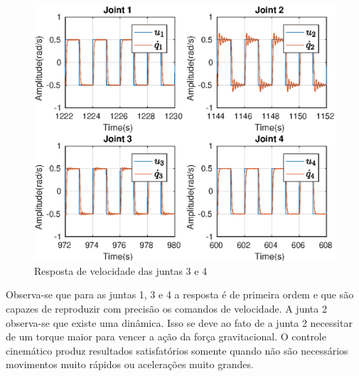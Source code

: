 \begin{figure}[H]
  \centering
    \includegraphics[width=\textwidth, clip=true, trim = 0 0 0 0.5\imageheight 0 mm]{./img/internal_loop}
  \caption{Resposta de velocidade das juntas 3 e 4}
\end{figure}

Observa-se que para as juntas 1, 3 e 4 a resposta é de primeira ordem e que são capazes de reproduzir com precisão os comandos de velocidade. A junta 2 observa-se que existe uma dinâmica. Isso se deve ao fato de a junta 2 necessitar de um torque maior para vencer a ação da força gravitacional. O controle cinemático produz resultados satisfatórios somente quando não são necessários movimentos muito rápidos ou acelerações muito grandes.


